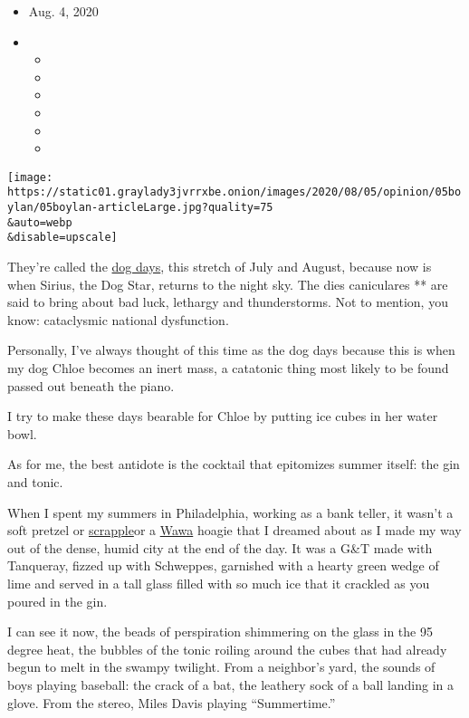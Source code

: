 \begin{itemize}
\item
  Aug. 4, 2020
\item
  \begin{itemize}
  \item
  \item
  \item
  \item
  \item
  \item
  \end{itemize}
\end{itemize}

\texttt{[image: https://static01.graylady3jvrrxbe.onion/images/2020/08/05/opinion/05boylan/05boylan-articleLarge.jpg?quality=75\\\&auto=webp\\\&disable=upscale]}

They're called the
\href{https://www.almanac.com/content/what-are-dog-days-summer}{dog
days}, this stretch of July and August, because now is when Sirius, the
Dog Star, returns to the night sky. The dies caniculares ** are said to
bring about bad luck, lethargy and thunderstorms. Not to mention, you
know: cataclysmic national dysfunction.

Personally, I've always thought of this time as the dog days because
this is when my dog Chloe becomes an inert mass, a catatonic thing most
likely to be found passed out beneath the piano.

I try to make these days bearable for Chloe by putting ice cubes in her
water bowl.

As for me, the best antidote is the cocktail that epitomizes summer
itself: the gin and tonic.

When I spent my summers in Philadelphia, working as a bank teller, it
wasn't a soft pretzel or
\href{https://www.eater.com/2015/9/1/9211867/scrapple-goetta-livermush-what-is-it}{scrapple}or
a \href{https://mashable.com/2016/03/09/the-cult-of-wawa/}{Wawa} hoagie
that I dreamed about as I made my way out of the dense, humid city at
the end of the day. It was a G\&T made with Tanqueray, fizzed up with
Schweppes, garnished with a hearty green wedge of lime and served in a
tall glass filled with so much ice that it crackled as you poured in the
gin.

I can see it now, the beads of perspiration shimmering on the glass in
the 95 degree heat, the bubbles of the tonic roiling around the cubes
that had already begun to melt in the swampy twilight. From a neighbor's
yard, the sounds of boys playing baseball: the crack of a bat, the
leathery sock of a ball landing in a glove. From the stereo, Miles Davis
playing ``Summertime.''


